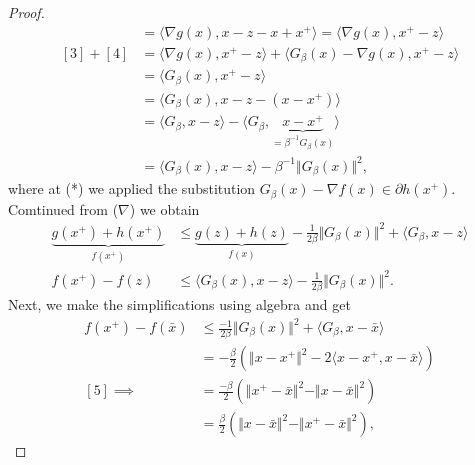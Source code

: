 \documentclass[]{article}
\theoremstyle{definition}
\begin{document}
\begin{proof}
\begin{align*}
                [3] &= \langle \nabla g(x), x - z - x + x^+\rangle = \langle \nabla g(x), x^+ - z\rangle
                \\
                [3] + [4] &= 
                \langle \nabla g(x), x^+ - z\rangle + \langle G_\beta(x) - \nabla g(x), x^+ - z\rangle \tag{**}
                \\
                &= \langle G_\beta(x), x^+ - z\rangle 
                \\
                &= \langle G_\beta(x), x - z - (x - x^+)\rangle
                \\
                &= \langle G_\beta, x - z\rangle - \langle G_\beta, \underbrace{x - x^+}_{ = \beta^{-1}G_\beta(x)}\rangle
                \\
                &= \langle G_\beta(x), x - z\rangle - \beta^{-1}\Vert G_\beta(x)\Vert^2, 
            \end{align*}
            where at (*) we applied the substitution $G_\beta (x) - \nabla f(x)\in \partial h(x^+)$. 
            Comtinued from ($\nabla$) we obtain 
            \begin{align*}
                \underbrace{g(x^+) + h(x^+)}_{f(x^+)}
                & \le 
                \underbrace{g(z) + h(z)}_{f(x)} - \frac{1}{2\beta}\Vert G_\beta(x)\Vert^2 + \langle G_\beta, x - z\rangle
                \\
                f(x^+) - f(z) 
                &\le 
                \langle G_\beta(x), x - z\rangle - \frac{1}{2\beta}\Vert G_\beta(x)\Vert^2. \tag{$\star$}
            \end{align*}
            Next, we make the simplifications using algebra and get
            \begin{align*}
                f(x^+) - f(\bar x) 
                &\le 
                \frac{-1}{2\beta}\Vert G_\beta(x)\Vert^2
                + 
                \langle G_\beta, x - \bar x\rangle
                \\
                &= 
                -\frac{\beta}{2}(
                    \Vert x - x^+\Vert^2 - 2\langle x - x^+, x - \bar x\rangle
                )
                \\
                [5]
                \implies &= 
                \frac{-\beta}{2}(
                    \Vert x^+ - \bar x\Vert^2
                    - 
                    \Vert x - \bar x\Vert^2
                )
                \\
                &= 
                \frac{\beta}{2}(\Vert x - \bar x\Vert^2 - \Vert x^+ - \bar x\Vert^2), 

\end{align*}
\end{proof}
\end{document}
